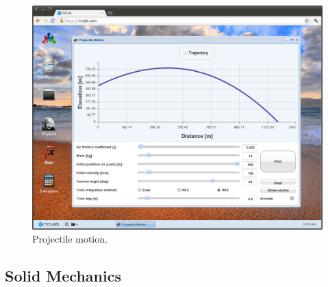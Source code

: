 \documentclass[article,A4,12pt]{llncs}
\begin{document}
\begin{figure}[!ht]
\begin{center}
\includegraphics[width=\textwidth]{img/kinem1.png}
\end{center}
\caption{Projectile motion.}
\label{fig:kinem1}
\end{figure}
\newpage
\noindent

\subsection{Solid Mechanics}
\end{document}
